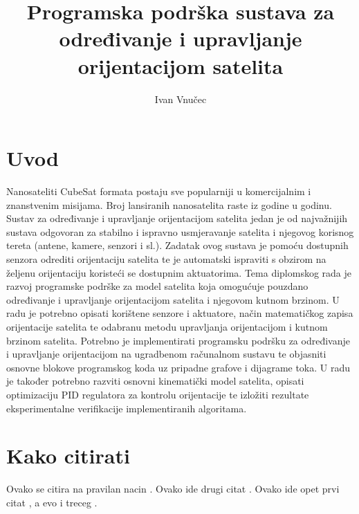 \documentclass[times, utf8, diplomski, numeric]{templates/fer}
\begin{document}

\title{Programska podrška sustava za određivanje i upravljanje orijentacijom satelita}

\author{Ivan Vnučec}

\maketitle

\izvornik


\tableofcontents

\chapter{Uvod}
Nanosateliti CubeSat formata postaju sve popularniji u komercijalnim i znanstvenim misijama. Broj lansiranih nanosatelita raste iz godine u godinu. Sustav za određivanje i upravljanje orijentacijom satelita jedan je od najvažnijih sustava odgovoran za stabilno i ispravno usmjeravanje satelita i njegovog korisnog tereta (antene, kamere, senzori i sl.). Zadatak ovog sustava je pomoću dostupnih senzora odrediti orijentaciju satelita te je automatski ispraviti s obzirom na željenu orijentaciju koristeći se dostupnim aktuatorima. Tema diplomskog rada je razvoj programske podrške za model satelita koja omogućuje pouzdano određivanje i upravljanje orijentacijom satelita i njegovom kutnom brzinom. U radu je potrebno opisati korištene senzore i aktuatore, način matematičkog zapisa orijentacije satelita te odabranu metodu upravljanja orijentacijom i kutnom brzinom satelita. Potrebno je implementirati programsku podršku za određivanje i upravljanje orijentacijom na ugradbenom računalnom sustavu te objasniti osnovne blokove programskog koda uz pripadne grafove i dijagrame toka. U radu je također potrebno razviti osnovni kinematički model satelita, opisati optimizaciju PID regulatora za kontrolu orijentacije te izložiti rezultate eksperimentalne verifikacije implementiranih algoritama. 

\chapter{Kako citirati}
Ovako se citira na pravilan nacin \cite{oetiket2007lshort}. Ovako ide drugi citat \cite{downes2002shortams}. Ovako ide opet prvi citat \cite{oetiket2007lshort}, a evo i treceg \cite{ungar2002uvod}.
\end{document}
